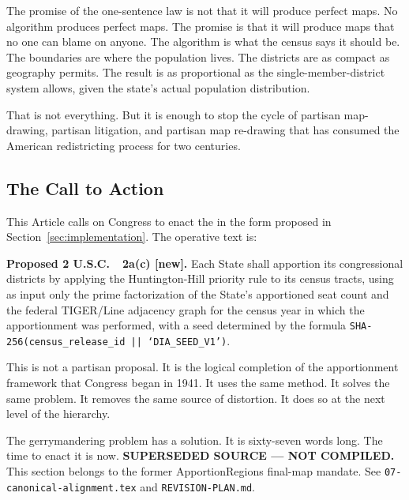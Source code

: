 The promise of the one-sentence law is not that it will produce perfect maps.
No algorithm produces perfect maps.
The promise is that it will produce maps that no one can blame on anyone.
The algorithm is what the census says it should be.
The boundaries are where the population lives.
The districts are as compact as geography permits.
The result is as proportional as the single-member-district system allows,
given the state's actual population distribution.

That is not everything.
But it is enough to stop the cycle of partisan map-drawing, partisan
litigation, and partisan map re-drawing that has consumed the American
redistricting process for two centuries.

\subsection{The Call to Action}

This Article calls on Congress to enact the \dia{} in the form proposed
in Section~\ref{sec:implementation}.
The operative text is:

\begin{statute}
\noindent\textbf{Proposed 2 U.S.C.\ \usca{}\ 2a(c) [new].}
Each State shall apportion its congressional districts by applying the
Huntington-Hill priority rule to its census tracts, using as input only
the prime factorization of the State's apportioned seat count and the
federal TIGER/Line adjacency graph for the census year in which the
apportionment was performed, with a seed determined by the formula
\texttt{SHA-256(census\_release\_id || `DIA\_SEED\_V1')}.
\end{statute}

This is not a partisan proposal.
It is the logical completion of the apportionment framework that Congress
began in 1941.
It uses the same method.
It solves the same problem.
It removes the same source of distortion.
It does so at the next level of the hierarchy.

The gerrymandering problem has a solution.
It is sixty-seven words long.
The time to enact it is now.
\noindent\textbf{SUPERSEDED SOURCE --- NOT COMPILED.} This section belongs to
the former ApportionRegions final-map mandate. See
\texttt{07-canonical-alignment.tex} and \texttt{REVISION-PLAN.md}.
